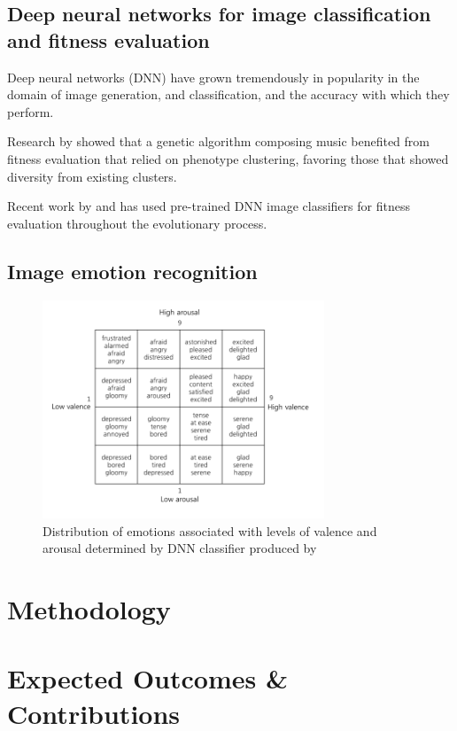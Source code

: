 \documentclass{article}
\begin{document}
\subsection{Deep neural networks for image classification and fitness evaluation}
Deep neural networks (DNN) have grown tremendously in popularity in the domain of image generation, and classification, and the accuracy with which they perform.

Research by \citet{burton1998genetic} showed that a genetic algorithm composing music benefited from fitness evaluation that relied on phenotype clustering, favoring those that showed diversity from existing clusters.

Recent work by \citet{nguyen2015deep} and \citet{nguyen2015innovation} has used pre-trained DNN image classifiers for fitness evaluation throughout the evolutionary process.
	
\subsection{Image emotion recognition}
	
\begin{figure}[h!]
	\includegraphics[width=0.75\textwidth]{images/valence-arousal-grid.png}
	\caption{Distribution of emotions associated with levels of valence and arousal determined by DNN classifier produced by \citet{kim2018building}}
	\label{fig:valence-arousal}
\end{figure}

\section{Methodology}


\section{Expected Outcomes \& Contributions}





\end{document}
